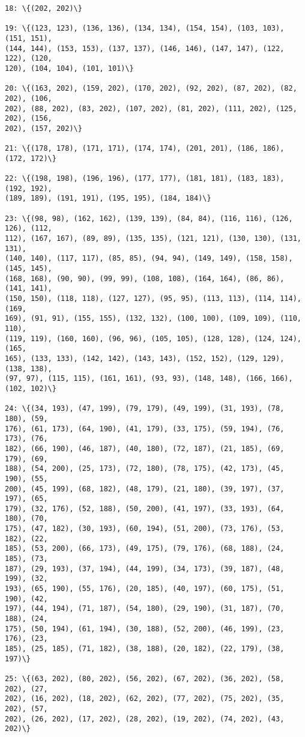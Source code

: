 \documentclass[11pt]{article}
\begin{document}
\begin{Verbatim}[commandchars=\\\{\}]
18: \{(202, 202)\}

19: \{(123, 123), (136, 136), (134, 134), (154, 154), (103, 103), (151, 151),
(144, 144), (153, 153), (137, 137), (146, 146), (147, 147), (122, 122), (120,
120), (104, 104), (101, 101)\}

20: \{(163, 202), (159, 202), (170, 202), (92, 202), (87, 202), (82, 202), (106,
202), (88, 202), (83, 202), (107, 202), (81, 202), (111, 202), (125, 202), (156,
202), (157, 202)\}

21: \{(178, 178), (171, 171), (174, 174), (201, 201), (186, 186), (172, 172)\}

22: \{(198, 198), (196, 196), (177, 177), (181, 181), (183, 183), (192, 192),
(189, 189), (191, 191), (195, 195), (184, 184)\}

23: \{(98, 98), (162, 162), (139, 139), (84, 84), (116, 116), (126, 126), (112,
112), (167, 167), (89, 89), (135, 135), (121, 121), (130, 130), (131, 131),
(140, 140), (117, 117), (85, 85), (94, 94), (149, 149), (158, 158), (145, 145),
(168, 168), (90, 90), (99, 99), (108, 108), (164, 164), (86, 86), (141, 141),
(150, 150), (118, 118), (127, 127), (95, 95), (113, 113), (114, 114), (169,
169), (91, 91), (155, 155), (132, 132), (100, 100), (109, 109), (110, 110),
(119, 119), (160, 160), (96, 96), (105, 105), (128, 128), (124, 124), (165,
165), (133, 133), (142, 142), (143, 143), (152, 152), (129, 129), (138, 138),
(97, 97), (115, 115), (161, 161), (93, 93), (148, 148), (166, 166), (102, 102)\}

24: \{(34, 193), (47, 199), (79, 179), (49, 199), (31, 193), (78, 180), (59,
176), (61, 173), (64, 190), (41, 179), (33, 175), (59, 194), (76, 173), (76,
182), (66, 190), (46, 187), (40, 180), (72, 187), (21, 185), (69, 179), (69,
188), (54, 200), (25, 173), (72, 180), (78, 175), (42, 173), (45, 190), (55,
200), (45, 199), (68, 182), (48, 179), (21, 180), (39, 197), (37, 197), (65,
179), (32, 176), (52, 188), (50, 200), (41, 197), (33, 193), (64, 180), (70,
175), (47, 182), (30, 193), (60, 194), (51, 200), (73, 176), (53, 182), (22,
185), (53, 200), (66, 173), (49, 175), (79, 176), (68, 188), (24, 185), (73,
187), (29, 193), (37, 194), (44, 199), (34, 173), (39, 187), (48, 199), (32,
193), (65, 190), (55, 176), (20, 185), (40, 197), (60, 175), (51, 190), (42,
197), (44, 194), (71, 187), (54, 180), (29, 190), (31, 187), (70, 188), (24,
175), (50, 194), (61, 194), (30, 188), (52, 200), (46, 199), (23, 176), (23,
185), (25, 185), (71, 182), (38, 188), (20, 182), (22, 179), (38, 197)\}

25: \{(63, 202), (80, 202), (56, 202), (67, 202), (36, 202), (58, 202), (27,
202), (16, 202), (18, 202), (62, 202), (77, 202), (75, 202), (35, 202), (57,
202), (26, 202), (17, 202), (28, 202), (19, 202), (74, 202), (43, 202)\}


\end{Verbatim}
\end{document}
